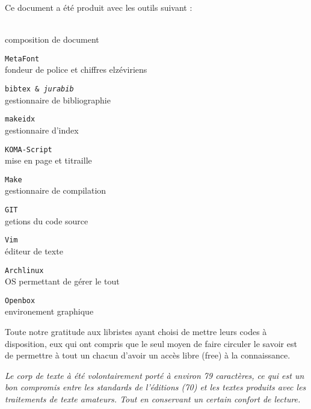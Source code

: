 
\newcommand\colophon[2]{\par\texttt{#1}\\ #2\medskip}

\cleardoublepage
\thispagestyle{empty}
\begin{center}
\small
Ce document a été produit avec les outils suivant :

\begin{multicols}{2}
\par\LaTeXe{}\\ composition de document\medskip
\colophon{MetaFont}{fondeur de police et chiffres elzéviriens}
\colophon{bibtex \& \emph{jurabib}}{gestionnaire de bibliographie}
\colophon{makeidx}{gestionnaire d'index}
\colophon{KOMA-Script}{mise en page et titraille}
\colophon{Make}{gestionnaire de compilation}
\colophon{GIT}{getions du code source}
\colophon{Vim}{éditeur de texte}
\colophon{Archlinux}{OS permettant de gérer le tout}
\colophon{Openbox}{environement graphique}
\end{multicols}

\bigskip

Toute notre gratitude aux libristes ayant choisi de mettre leurs codes à disposition,
eux qui ont compris que le seul moyen de faire circuler le savoir est de permettre
à tout un chacun d'avoir un accès libre (free) à la connaissance.

\bigskip\bigskip

\emph{%
Le corp de texte à été volontairement porté à environ 79 caractères,
	ce qui est un bon compromis entre les standards de l'éditions (70)
	et les textes produits avec les traitements de texte amateurs.
Tout en conservant un certain confort de lecture. 
}
\end{center}

